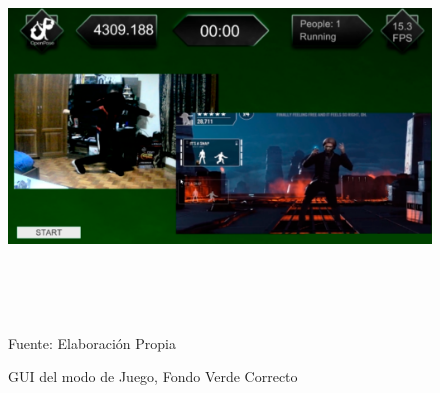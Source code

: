 \clearpage
\begin{figure}[h]
	\centering
	\includegraphics[width=16cm,height=10cm]{./Images/play2.png}
	\caption{GUI del modo de Juego, Fondo Verde Correcto}
	\footnotesize Fuente: Elaboración Propia
	\label{gui4.3}
\end{figure}

